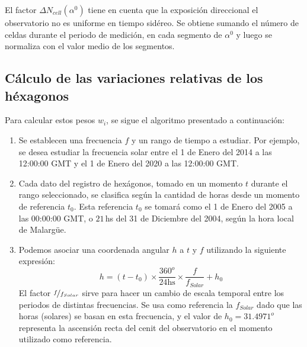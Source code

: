 El factor $\Delta N _{cell}(\alpha^0)$ tiene en cuenta que la exposición  direccional  el observatorio no es uniforme en tiempo sidéreo.  Se obtiene sumando el número de celdas durante el periodo de medición, en cada segmento de $\alpha^0$ y luego se normaliza con el valor medio de los segmentos.

\subsection{Cálculo de las variaciones relativas de los héxagonos}
Para calcular estos pesos $w_i$, se sigue el algoritmo presentado a continuación:
     
      \begin{enumerate}
        \item Se establecen una frecuencia $f$  y un rango de tiempo a estudiar. Por ejemplo, se desea estudiar la frecuencia solar entre el 1 de Enero del 2014 a las 12:00:00 GMT y el 1 de Enero del 2020 a las 12:00:00 GMT.

        \item Cada dato del registro de hexágonos, tomado en un momento $t$ durante el rango seleccionado, se clasifica según la cantidad de horas desde un momento de referencia $t_0$. Esta referencia $t_0$ se tomará como el 1 de Enero del 2005 a las 00:00:00 GMT, o  $21\,$hs del 31 de Diciembre del 2004, según la hora local de Malargüe.

        \item Podemos asociar una coordenada angular $h$ a $t$  y $f$  utilizando la siguiente expresión:
         \begin{equation}
          h = (t-t_0) \times \frac{360^o}{24\text{hs}} \times\frac{f}{f_{Solar}} + h_0
          \label{eq:h_horas} 
        \end{equation}
        El factor $\nicefrac{f}{f_{Solar}}$ sirve para hacer un cambio de escala temporal entre los periodos de distintas frecuencias. Se usa como referencia la $f_{Solar}$ dado que las horas (solares) se basan en esta frecuencia, y el valor de $h_0=31.4971^o$ representa la ascensión recta del cenit del observatorio en el momento utilizado como referencia.
        

\end{enumerate}
